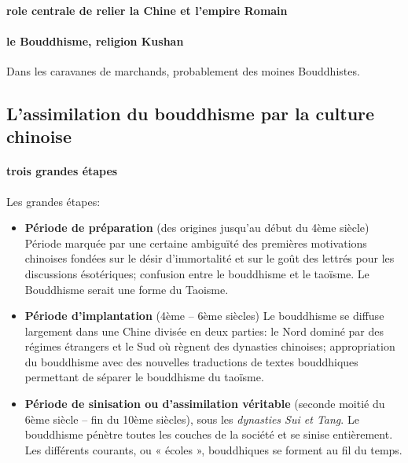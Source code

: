  \paragraph{role centrale de relier la Chine et l'empire Romain} 

 \paragraph{le Bouddhisme, religion Kushan} Dans les caravanes de marchands, probablement des moines Bouddhistes.




\subsection{L’assimilation du bouddhisme par la culture chinoise}

\paragraph{trois grandes étapes}

Les grandes étapes:
\begin{itemize}
    \item  	\textbf{Période de préparation} (des origines jusqu’au début du 4ème siècle)
Période marquée par une certaine ambiguïté des premières motivations chinoises fondées sur le désir d’immortalité et sur le goût des lettrés pour les discussions ésotériques; confusion entre le bouddhisme et le taoïsme. Le Bouddhisme serait une forme du Taoisme.

 \item 	\textbf{Période d’implantation} (4ème – 6ème siècles)
Le bouddhisme se diffuse largement dans une Chine divisée en deux parties: le Nord dominé par des régimes étrangers et le Sud où règnent des dynasties chinoises; appropriation du bouddhisme avec des nouvelles traductions de textes bouddhiques permettant de séparer le bouddhisme du taoïsme.
 


 \item 	\textbf{Période de sinisation ou d’assimilation véritable} (seconde moitié du 6ème siècle – fin du 10ème siècles), sous les \textit{dynasties Sui et Tang}.  Le bouddhisme pénètre toutes les couches de la société et se sinise entièrement. Les différents courants, ou « écoles », bouddhiques se forment au fil du temps.
 
\end{itemize}

